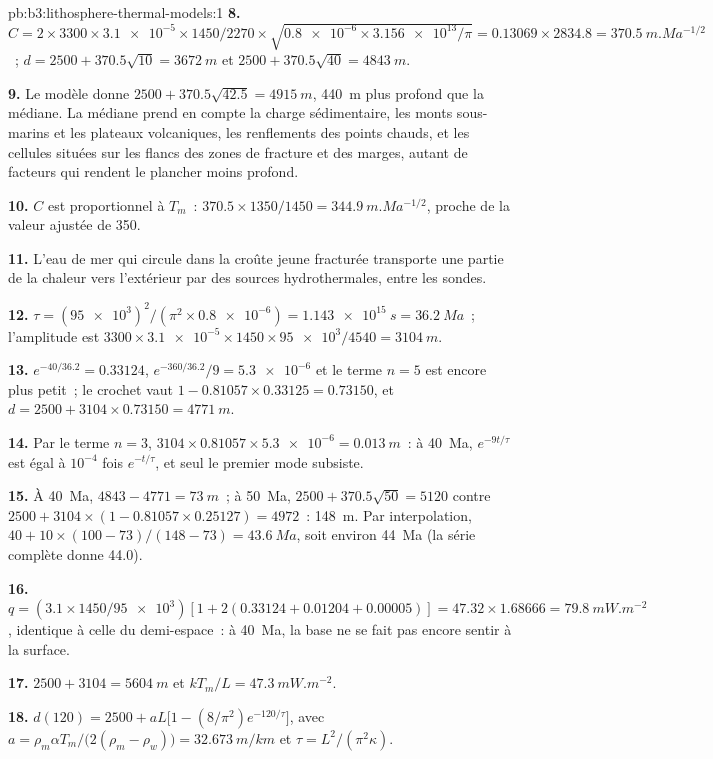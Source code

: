 \begin{solution}{pb:b3:lithosphere-thermal-models:1}
\textbf{8.} $C = 2\times3300\times\num{3.1e-5}\times1450/2270\times
\sqrt{\num{0.8e-6}\times\num{3.156e13}/\pi} = 0.13069\times2834.8 =
\qty{370.5}{m.Ma^{-1/2}}$~; $d = 2500 + 370.5\sqrt{10} = \qty{3672}{m}$ et
$2500 + 370.5\sqrt{40} = \qty{4843}{m}$.

\textbf{9.} Le modèle donne $2500 + 370.5\sqrt{42.5} = \qty{4915}{m}$,
\qty{440}{m} plus profond que la médiane. La médiane prend en compte la charge
sédimentaire, les monts sous-marins et les plateaux volcaniques, les renflements des points chauds, et
les cellules situées sur les flancs des zones de fracture et des marges, autant de facteurs qui rendent le plancher
moins profond.

\textbf{10.} $C$ est proportionnel à $T_m$~: $370.5\times1350/1450 =
\qty{344.9}{m.Ma^{-1/2}}$, proche de la valeur ajustée de 350.

\textbf{11.} L'eau de mer qui circule dans la croûte jeune fracturée transporte
une partie de la chaleur vers l'extérieur par des sources hydrothermales, entre les sondes.

\textbf{12.} $\tau = (\num{95e3})^2/(\pi^2\times\num{0.8e-6}) =
\qty{1.143e15}{s} = \qty{36.2}{Ma}$~; l'amplitude est $3300\times
\num{3.1e-5}\times1450\times\num{95e3}/4540 = \qty{3104}{m}$.

\textbf{13.} $e^{-40/36.2} = 0.33124$, $e^{-360/36.2}/9 = \num{5.3e-6}$ et le
terme $n = 5$ est encore plus petit~; le crochet vaut $1 - 0.81057\times0.33125 =
0.73150$, et $d = 2500 + 3104\times0.73150 = \qty{4771}{m}$.

\textbf{14.} Par le terme $n = 3$, $3104\times0.81057\times\num{5.3e-6} =
\qty{0.013}{m}$~: à \qty{40}{Ma}, $e^{-9t/\tau}$ est égal à $10^{-4}$ fois
$e^{-t/\tau}$, et seul le premier mode subsiste.

\textbf{15.} À \qty{40}{Ma}, $4843 - 4771 = \qty{73}{m}$~; à
\qty{50}{Ma}, $2500 + 370.5\sqrt{50} = 5120$ contre $2500 + 3104\times(1 -
0.81057\times0.25127) = 4972$~: \qty{148}{m}. Par interpolation, $40 + 10\times
(100 - 73)/(148 - 73) = \qty{43.6}{Ma}$, soit environ \qty{44}{Ma} (la série complète
donne 44.0).

\textbf{16.} $q = (3.1\times1450/\num{95e3})[1 + 2(0.33124 + 0.01204 +
0.00005)] = 47.32\times1.68666 = \qty{79.8}{mW.m^{-2}}$, identique à
celle du demi-espace~: à \qty{40}{Ma}, la base ne se fait pas encore sentir à la
surface.

\textbf{17.} $2500 + 3104 = \qty{5604}{m}$ et $kT_m/L = \qty{47.3}{mW.m^{-2}}$.

\textbf{18.} $d(120) = 2500 + aL\bigl[1 - (8/\pi^2)e^{-120/\tau}\bigr]$, avec
$a = \rho_m\alpha T_m/\bigl(2(\rho_m - \rho_w)\bigr) = \qty{32.673}{m/km}$ et
$\tau = L^2/(\pi^2\kappa)$.


\end{solution}
